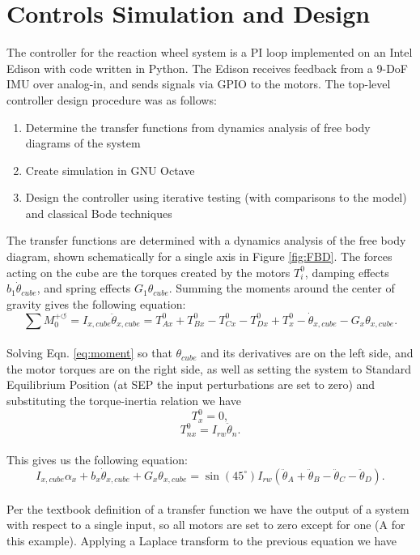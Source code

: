 \documentclass[]{aiaa-tc}%
\begin{document}
\section{Controls Simulation and Design}
The controller for the reaction wheel system is a PI loop implemented on an Intel Edison with code written in Python. The Edison receives feedback from a 9-DoF IMU over analog-in, and sends signals via GPIO to the motors. The top-level controller design procedure was as follows:
\begin{enumerate}
\item Determine the transfer functions from dynamics analysis of free body diagrams of the system
\item Create simulation in GNU Octave
\item Design the controller using iterative testing (with comparisons to the model) and classical Bode techniques
\end{enumerate}
The transfer functions are determined with a dynamics analysis of the free body diagram, shown schematically for a single axis in Figure \ref{fig:FBD}. The forces acting on the cube are the torques created by the motors $T_i^0$, damping effects $b_1 \dot{\theta}_{cube}$, and spring effects $G_1 \theta_{cube}$. Summing the moments around the center of gravity gives the following equation:\\

\begin{equation}
\label{eq:moment}
\sum M_0^{+ \circlearrowleft} = I_{x,cube} \ddot{\theta}_{x,cube} = T^0_{Ax} + T^0_{Bx} - T^0_{Cx} - T^0_{Dx} + T^0_x - \dot{\theta}_{x,cube} - G_x \theta_{x,cube}.
\end{equation}\\
	
Solving Eqn. \ref{eq:moment} so that $\theta_{cube}$ and its derivatives are on the left side, and the motor torques are on the right side, as well as setting the system to Standard Equilibrium Position (at SEP the input perturbations are set to zero) and substituting the torque-inertia relation we have\\

\[
T^0_x = 0,
\]
\[
T^0_{nx} = I_{rw}\ddot{\theta}_n.\]\\

This gives us the following equation:\\
 
\[
I_{x,cube} \alpha_x + b_x \dot{\theta}_{x,cube} + G_x \theta_{x,cube} = \sin(45^{\circ}) I_{rw} (\ddot{\theta}_A + \ddot{\theta}_B -\ddot{\theta}_C - \ddot{\theta}_D).
\]\\	
Per the textbook definition of a transfer function we have the output of a system with respect to a single input, so all motors are set to zero except for one (A for this example). Applying a Laplace transform to the previous equation we have\\
\end{document}
